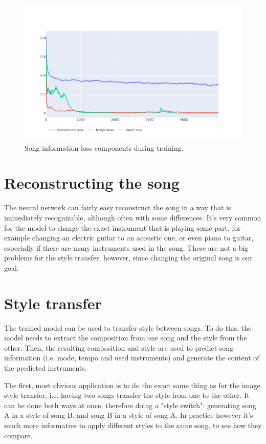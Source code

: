 \documentclass[en]{pracamgr}
\begin{document}
\begin{figure}
    \centering
    \includegraphics[width=\linewidth]{figures/song-info.pdf}
    \caption{Song information loss components during training.}
    \label{fig:song_info}
\end{figure}

\section{Reconstructing the song}

The neural network can fairly easy reconstruct the song in a way that is immediately recognizable, although often with some differences.
It's very common for the model to change the exact instrument that is playing some part, for example changing an electric guitar to an acoustic one, or even piano to guitar, especially if there are many instruments used in the song.
These are not a big problems for the style transfer, however, since changing the original song is our goal.

\section{Style transfer}

The trained model can be used to transfer style between songs.
To do this, the model needs to extract the composition from one song and the style from the other.
Then, the resulting composition and style are used to predict song information (i.e. mode, tempo and used instruments) and generate the content of the predicted instruments.

The first, most obvious application is to do the exact same thing as for the image style transfer, i.e. having two songs transfer the style from one to the other.
It can be done both ways at once, therefore doing a "style switch": generating song A in a style of song B, and song B in a style of song A.
In practice however it's much more informative to apply different styles to the same song, to see how they compare.
\end{document}
